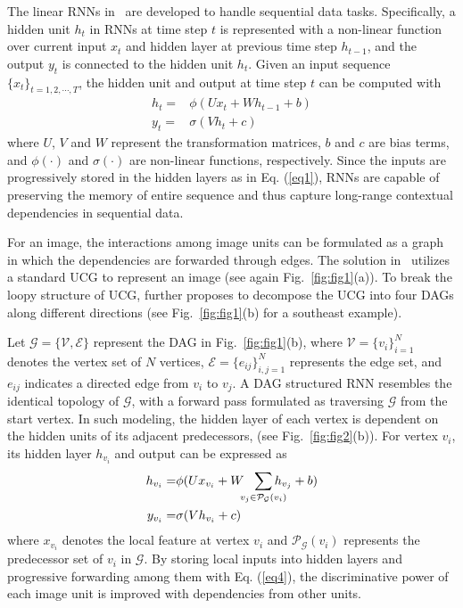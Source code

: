 \documentclass[10pt,twocolumn,letterpaper]{article}
\begin{document}
The linear RNNs in~\cite{elman1990finding} are developed to handle sequential data tasks. Specifically, a hidden unit $h_t$ in RNNs at time step $t$ is represented with a non-linear function over current input $x_t$ and hidden layer at previous time step $h_{t-1}$, and the output $y_t$ is connected to the hidden unit $h_t$. Given an input sequence $\{x_t\}_{t=1,2,\cdots,T}$, the hidden unit and output at time step $t$ can be computed with
\begin{align}
h_t = &\phi(Ux_t+Wh_{t-1}+b) \label{eq1} \\
y_t = &\sigma(Vh_t+c)
\end{align}
where $U$, $V$ and $W$ represent the transformation matrices, $b$ and $c$ are bias terms, and $\phi(\cdot)$ and $\sigma(\cdot)$ are non-linear functions, respectively. Since the inputs are progressively stored in the hidden layers as in Eq. (\ref{eq1}), RNNs are capable of preserving the memory of entire sequence and thus capture long-range contextual dependencies in sequential data.

For an image, the interactions among image units can be formulated as a graph in which the dependencies are forwarded through edges. The solution in~\cite{shuai2017scene} utilizes a standard UCG to represent an image (see again Fig.~\ref{fig:fig1}(a)). To break the loopy structure of UCG, \cite{shuai2017scene} further proposes to decompose the UCG into four DAGs along different directions (see Fig.~\ref{fig:fig1}(b) for a southeast example).

Let $\mathcal{G}=\{\mathcal{V}, \mathcal{E}\}$ represent the DAG in Fig.~\ref{fig:fig1}(b), where $\mathcal{V}=\{v_{i}\}_{i=1}^N$ denotes the vertex set of $N$ vertices, $\mathcal{E}=\{e_{ij}\}_{i,j=1}^N$ represents the edge set, and $e_{ij}$ indicates a directed edge from $v_i$ to $v_j$. A DAG structured RNN resembles the identical topology of $\mathcal{G}$, with a forward pass formulated as traversing $\mathcal{G}$ from the start vertex. In such modeling, the hidden layer of each vertex is dependent on the hidden units of its adjacent predecessors, (see Fig.~\ref{fig:fig2}(b)). For vertex $v_i$, its hidden layer $h_{v_i}$ and output can be expressed as
\begin{align}
h_{v_i} = &\phi(Ux_{v_i}+W~~\sum\limits_{\mathclap{v_j\in{\mathcal{P}_{\mathcal{G}}(v_i)}}}{h_{v_j}}+b) \label{eq4} \\
y_{v_i} = &\sigma(Vh_{v_i}+c)
\end{align}
where $x_{v_i}$ denotes the local feature at vertex $v_i$ and $\mathcal{P}_{\mathcal{G}}(v_i)$ represents the predecessor set of $v_i$ in $\mathcal{G}$. By storing local inputs into hidden layers and progressive forwarding among them with Eq. (\ref{eq4}), the discriminative power of each image unit is improved with dependencies from other units.
\end{document}
